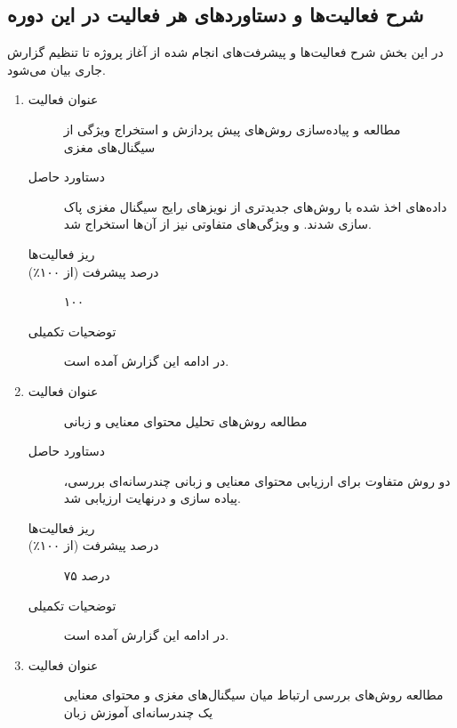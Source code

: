 \subsection{شرح فعالیت‌ها و دستاورد‌های هر فعالیت در این دوره}
در این بخش شرح فعالیت‌ها و پیشرفت‌های انجام شده از آغاز پروژه تا تنظیم گزارش جاری بیان می‌شود. 
\begin{enumerate}
	\item
	{
		\begin{description}
			\item[عنوان فعالیت] مطالعه‌ و پیاده‌سازی روش‌های پیش پردازش و استخراج ویژگی از سیگنال‌های مغزی
			\item[دستاورد حاصل] داده‌های اخذ شده
			\cite{latifzadeh2020evaluating}
			با روش‌های جدیدتری از نویز‌های رایج سیگنال مغزی پاک سازی شدند. و ویژگی‌های متفاوتی نیز از آن‌ها استخراج شد.
			\item[ریز فعالیت‌ها]
			{
			}
			\item[درصد پیشرفت (از ۱۰۰٪)] ۱۰۰	
			\item[توضحیات تکمیلی] در ادامه این گزارش آمده است.
	\end{description}
	}
	\item
	{
		\begin{description}
			\item[عنوان فعالیت] مطالعه روش‌های تحلیل محتوای معنایی و زبانی
			\item[دستاورد حاصل] دو روش متفاوت برای ارزیابی محتوای معنایی و زبانی چندرسانه‌ای بررسی، پیاده سازی و درنهایت ارزیابی شد.	
			\item[ریز فعالیت‌ها]
			{
			}
			\item[درصد پیشرفت (از ۱۰۰٪)] ۷۵ درصد	
			\item[توضحیات تکمیلی] در ادامه این گزارش آمده است.
		\end{description}
	}
	\item
	{
		\begin{description}
			\item[عنوان فعالیت] مطالعه روش‌های بررسی ارتباط میان سیگنال‌های مغزی و محتوای معنایی یک چندرسانه‌ای آموزش زبان\\
			

\end{description}}
\end{enumerate}
